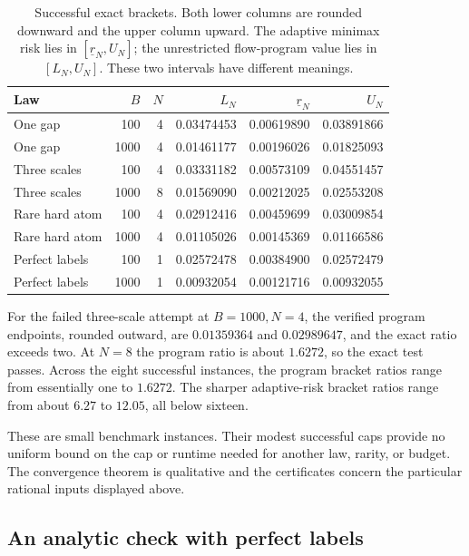 \begin{table}[htbp]
\centering
\small
\setlength{\tabcolsep}{4pt}
\begin{tabular}{lrr rrr}
\toprule
Law & $B$ & $N$ & $L_N$ & $\underline r_N$ & $U_N$\\
\midrule
One gap & 100 & 4 & 0.03474453 & 0.00619890 & 0.03891866\\
One gap & 1000 & 4 & 0.01461177 & 0.00196026 & 0.01825093\\
Three scales & 100 & 4 & 0.03331182 & 0.00573109 & 0.04551457\\
Three scales & 1000 & 8 & 0.01569090 & 0.00212025 & 0.02553208\\
Rare hard atom & 100 & 4 & 0.02912416 & 0.00459699 & 0.03009854\\
Rare hard atom & 1000 & 4 & 0.01105026 & 0.00145369 & 0.01166586\\
Perfect labels & 100 & 1 & 0.02572478 & 0.00384900 & 0.02572479\\
Perfect labels & 1000 & 1 & 0.00932054 & 0.00121716 & 0.00932055\\
\bottomrule
\end{tabular}
\caption{Successful exact brackets. Both lower columns are rounded
downward and the upper column upward. The adaptive minimax risk lies
in $[\underline r_N,U_N]$; the unrestricted flow-program value lies
in $[L_N,U_N]$. These two intervals have different meanings.}
\label{tab:exact-brackets}
\end{table}

For the failed three-scale attempt at $B=1000,N=4$, the verified
program endpoints, rounded outward, are $0.01359364$ and $0.02989647$,
and the exact ratio exceeds two. At $N=8$ the program ratio is about
$1.6272$, so the exact test passes. Across the eight successful
instances, the program bracket ratios range from essentially one to
$1.6272$. The sharper adaptive-risk bracket ratios range from about
$6.27$ to $12.05$, all below sixteen.

These are small benchmark instances. Their modest successful caps
provide no uniform bound on the cap or runtime needed for another law,
rarity, or budget. The convergence theorem is qualitative and the
certificates concern the particular rational inputs displayed above.

\subsection{An analytic check with perfect labels}

